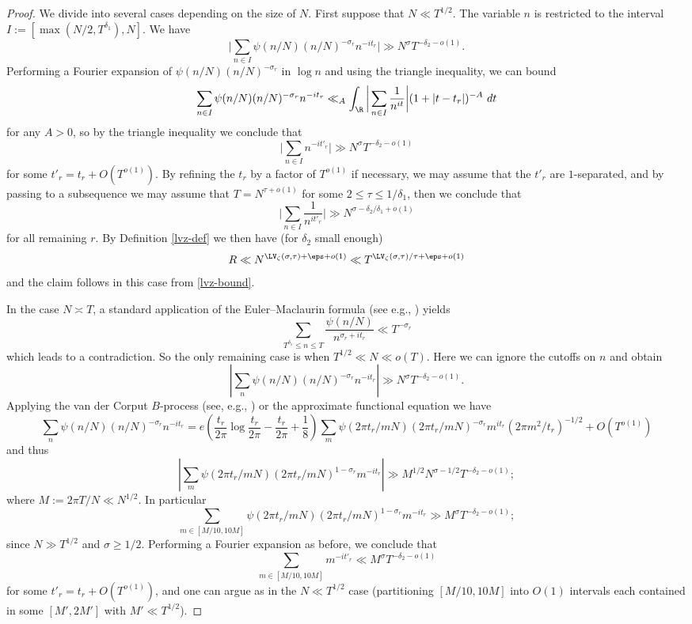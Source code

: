 \begin{proof}
We divide into several cases depending on the size of $N$.  First suppose that $N \ll T^{1/2}$.  The variable $n$ is restricted to the interval $I := [\max(N/2, T^{\delta_1}), N]$.  We have
$$ \bigg|\sum_{n \in I} \psi(n/N) (n/N)^{-\sigma_r} n^{-it_r} \bigg| \gg N^\sigma T^{-\delta_2 - o(1)}.$$
Performing a Fourier expansion of $\psi(n/N) (n/N)^{-\sigma_r}$ in $\log n$ and using the triangle inequality, we can bound
$$ \sum_{n \in I} \psi(n/N) (n/N)^{-\sigma_r} n^{-it_r}  \ll_A \int_\R \bigg| \sum_{n \in I} \frac{1}{n^{it}} \bigg| (1+|t-t_r|)^{-A}\ dt$$
for any $A>0$, so by the triangle inequality we conclude that
$$ \bigg|\sum_{n \in I} n^{-it'_r} \bigg| \gg N^\sigma T^{-\delta_2 - o(1)}$$
for some $t'_r = t_r + O(T^{o(1)})$.  By refining the $t_r$ by a factor of $T^{o(1)}$ if necessary, we may assume that the $t'_r$ are $1$-separated, and by passing to a subsequence we may assume that $T = N^{\tau+o(1)}$ for some $2 \leq \tau \leq 1/\delta_1$, then
we conclude that
$$ \bigg| \sum_{n \in I} \frac{1}{n^{it'_r}} \bigg| \gg N^{\sigma-\delta_2/\delta_1+o(1)}$$
for all remaining $r$.  By Definition \ref{lvz-def} we then have (for $\delta_2$ small enough)
$$ R \ll N^{\LV_\zeta(\sigma,\tau) + \eps + o(1)} \ll T^{\LV_\zeta(\sigma,\tau)/\tau + \eps + o(1)}$$
and the claim follows in this case from \eqref{lvz-bound}.

In the case $N \asymp T$, a standard application of the Euler--Maclaurin formula (see e.g., \cite[(2.1.2)]{titchmarsh_theory_1986}) yields
$$ \sum_{T^{\delta_1} \leq n \leq T} \frac{\psi(n/N)}{n^{\sigma_r+it_r}} \ll T^{-\sigma_r}$$
which leads to a contradiction.  So the only remaining case is when $T^{1/2} \ll N \ll o(T)$.  Here we can ignore the cutoffs on $n$ and obtain
$$ \left| \sum_{n} \psi(n/N) (n/N)^{-\sigma_r} n^{-it_r}\right| \gg N^{\sigma} T^{-\delta_2-o(1)}.$$
Applying the van der Corput $B$-process (see, e.g., \cite[\S 8.3]{ik}) or the approximate functional equation we have
$$ \sum_{n} \psi(n/N) (n/N)^{-\sigma_r} n^{-it_r} = e(\frac{t_r}{2\pi} \log \frac{t_r}{2\pi} - \frac{t_r}{2\pi} + \frac{1}{8}) \sum_{m} \psi(2\pi t_r/mN) (2\pi t_r/mN)^{-\sigma_r} m^{it_r} (2\pi m^2/t_r)^{-1/2} + O(T^{o(1)})$$
and thus
$$ \left| \sum_{m} \psi(2\pi t_r/mN) (2\pi t_r/mN)^{1-\sigma_r} m^{-it_r} \right| \gg M^{1/2} N^{\sigma-1/2} T^{-\delta_2-o(1)};$$
where $M := 2\pi T/N \ll N^{1/2}$.  In particular
$$ \sum_{m \in [M/10, 10 M]} \psi(2\pi t_r/mN) (2\pi t_r/mN)^{1-\sigma_r} m^{-it_r} \gg M^{\sigma} T^{-\delta_2-o(1)};$$
since $N \gg T^{1/2}$ and $\sigma \geq 1/2$.  Performing a Fourier expansion as before, we conclude that
$$ \sum_{m \in [M/10, 10 M]} m^{-it'_r} \ll M^{\sigma} T^{-\delta_2-o(1)}$$
for some $t'_r = t_r + O(T^{o(1)})$, and one can argue as in the $N \ll T^{1/2}$ case (partitioning $[M/10, 10M]$ into $O(1)$ intervals each contained in some $[M',2M']$ with $M' \ll T^{1/2}$).


\end{proof}
